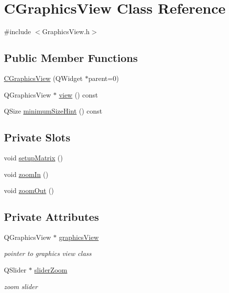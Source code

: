 \hypertarget{classCGraphicsView}{
\section{CGraphicsView Class Reference}
\label{classCGraphicsView}
}


{\ttfamily \#include $<$GraphicsView.h$>$}\subsection*{Public Member Functions}
\begin{DoxyCompactItemize}
\item 
\hyperlink{classCGraphicsView_ab8f66777de03ec943fbaede5f59e36bf}{CGraphicsView} (QWidget $\ast$parent=0)
\item 
QGraphicsView $\ast$ \hyperlink{classCGraphicsView_a2e28f55c94a25ebf465754843469f666}{view} () const 
\item 
QSize \hyperlink{classCGraphicsView_a4dc4d8f6b2eb14f0e68c3760b29b0edb}{minimumSizeHint} () const 
\end{DoxyCompactItemize}
\subsection*{Private Slots}
\begin{DoxyCompactItemize}
\item 
void \hyperlink{classCGraphicsView_a9766abb87c894de2696673d8f4d59b00}{setupMatrix} ()
\item 
void \hyperlink{classCGraphicsView_a6ab7dc0ecdd75857df6853958de85e20}{zoomIn} ()
\item 
void \hyperlink{classCGraphicsView_a5f04c98ba128a24812106e080b0f6c44}{zoomOut} ()
\end{DoxyCompactItemize}
\subsection*{Private Attributes}
\begin{DoxyCompactItemize}
\item 
\hypertarget{classCGraphicsView_a02e70bfb3b16ef3f1909691eec372cf9}{
QGraphicsView $\ast$ \hyperlink{classCGraphicsView_a02e70bfb3b16ef3f1909691eec372cf9}{graphicsView}}
\label{classCGraphicsView_a02e70bfb3b16ef3f1909691eec372cf9}

\begin{DoxyCompactList}\small\item\em pointer to graphics view class \item\end{DoxyCompactList}\item 
\hypertarget{classCGraphicsView_aaa0a9b3d88bf8c6ebdb762187433534c}{
QSlider $\ast$ \hyperlink{classCGraphicsView_aaa0a9b3d88bf8c6ebdb762187433534c}{sliderZoom}}
\label{classCGraphicsView_aaa0a9b3d88bf8c6ebdb762187433534c}

\begin{DoxyCompactList}\small\item\em zoom slider \item\end{DoxyCompactList}\end{DoxyCompactItemize}


